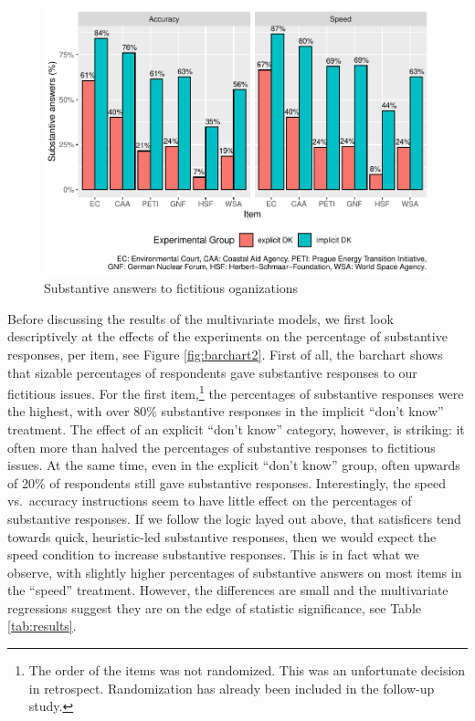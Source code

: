 \documentclass[Royal,times,sageh]{sagej}
\begin{document}
\begin{figure}
\includegraphics[width=1\linewidth]{article_files/figure-latex/barchart-1} \caption{\label{fig:barchart2}Substantive answers to fictitious oganizations}\label{fig:barchart}
\end{figure}

Before discussing the results of the multivariate models, we first look
descriptively at the effects of the experiments on the percentage of
substantive responses, per item, see Figure \ref{fig:barchart2}. First
of all, the barchart shows that sizable percentages of respondents gave
substantive responses to our fictitious issues. For the first
item,\footnote{The order of the items was not randomized. This was an
  unfortunate decision in retrospect. Randomization has already been
  included in the follow-up study.} the percentages of substantive
responses were the highest, with over 80\% substantive responses in the
implicit ``don't know'' treatment. The effect of an explicit ``don't
know'' category, however, is striking: it often more than halved the
percentages of substantive responses to fictitious issues. At the same
time, even in the explicit ``don't know'' group, often upwards of 20\%
of respondents still gave substantive responses. Interestingly, the
speed vs.~accuracy instructions seem to have little effect on the
percentages of substantive responses. If we follow the logic layed out
above, that satisficers tend towards quick, heuristic-led substantive
responses, then we would expect the speed condition to increase
substantive responses. This is in fact what we observe, with slightly
higher percentages of substantive answers on most items in the ``speed''
treatment. However, the differences are small and the multivariate
regressions suggest they are on the edge of statistic significance, see
Table \ref{tab:results}.
\end{document}
